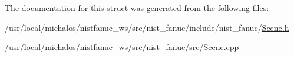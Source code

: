 The documentation for this struct was generated from the following files\-:\begin{DoxyCompactItemize}
\item 
/usr/local/michalos/nistfanuc\-\_\-ws/src/nist\-\_\-fanuc/include/nist\-\_\-fanuc/\hyperlink{Scene_8h}{Scene.\-h}\item 
/usr/local/michalos/nistfanuc\-\_\-ws/src/nist\-\_\-fanuc/src/\hyperlink{Scene_8cpp}{Scene.\-cpp}\end{DoxyCompactItemize}
